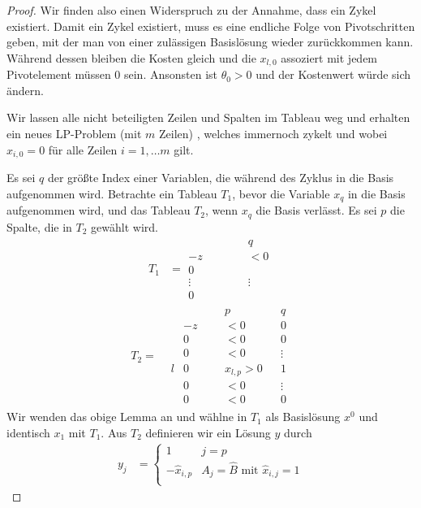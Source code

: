 \begin{proof}
Wir finden also einen Widerspruch zu der Annahme, dass ein Zykel existiert.
Damit ein Zykel existiert, muss es eine endliche Folge von Pivotschritten geben, mit der man von einer zulässigen Basislösung wieder zurückkommen kann.
Während dessen bleiben die Kosten gleich und die $x_{l,0}$ assoziert mit jedem Pivotelement müssen $0$ sein.
Ansonsten ist $\theta_0 > 0$ und der Kostenwert würde sich ändern.

Wir lassen alle nicht beteiligten Zeilen und Spalten im Tableau weg und erhalten ein neues LP-Problem (mit $m$ Zeilen) , welches immernoch zykelt und wobei $x_{i,0} = 0$ für alle Zeilen $i = 1,\dotsc m$ gilt.

Es sei $q$ der größte Index einer Variablen, die während des Zyklus in die Basis aufgenommen wird.
Betrachte ein Tableau $T_1$, bevor die Variable $x_{q}$ in die Basis aufgenommen wird, und das Tableau $T_2$, wenn $x_q$ die Basis verlässt.
Es sei $p$ die Spalte, die in $T_2$ gewählt wird.
\begin{align*}
T_1 &=\begin{matrix}
& & & & & q \\
-z & &  &  &  &  < 0 \\
0 & &  &  &  &  \\
\vdots &  &  &  &  & \vdots \\
0 & &  &  &  &
\end{matrix}
\end{align*}
\begin{align*}
T_2 = &\begin{matrix}
 & & & & p & & q \\
 &-z &  &  & < 0 &  & 0 \\
 & 0 &  &  & < 0 &  & 0 \\
 & 0 &  & & < 0 &  & \vdots \\
l & 0 &  &  & \hat{x}_{l,p}>0 &  & 1 \\
 & 0 &  &  & < 0 &  & \vdots \\
 & 0 &  &  & < 0 &  & 0
\end{matrix}
\end{align*}
Wir wenden das obige Lemma an und wählne in $T_1$ als Basislösung $x^0$ und identisch $x_1$ mit $T_1$.
Aus $T_2$ definieren wir ein Lösung $y$ durch
\begin{align*}
y_j &= \begin{cases}
1 & j = p \\
-\hat{x}_{i,p} & A_j = \hat{B} \text{ mit } \hat{x}_{i,j} = 1 \\

\end{cases}
\end{align*}
\end{proof}
